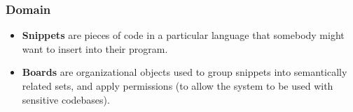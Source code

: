 
\begin{frame}
  \frametitle{Domain}

  \begin{itemize}[<+>]
    \item \textbf{Snippets} are pieces of code in a particular
      language that somebody might want to insert into their program.

    \item \textbf{Boards} are organizational objects used to group
      snippets into semantically related sets, and apply permissions
      (to allow the system to be used with sensitive codebases).
  \end{itemize}
\end{frame}